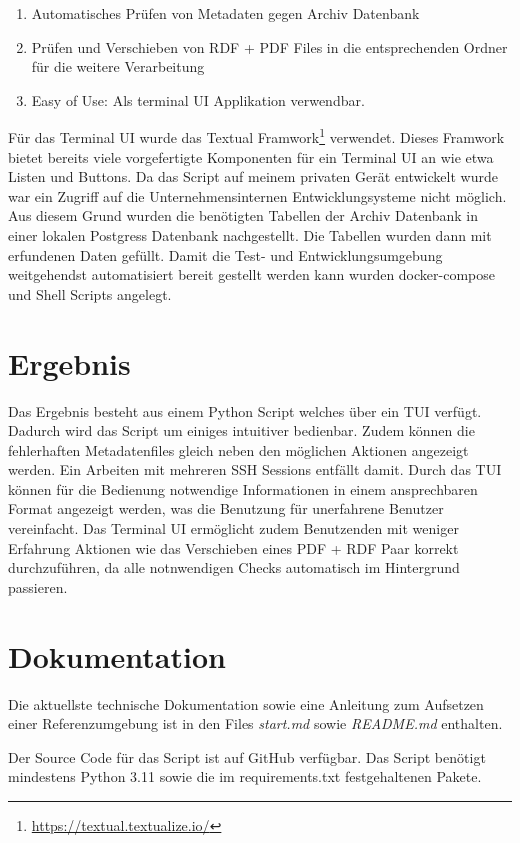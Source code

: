 \documentclass[a4paper,oneside, 12pt]{report}
\begin{document}
\begin{enumerate}
  \item Automatisches Prüfen von Metadaten gegen Archiv Datenbank
  \item Prüfen und Verschieben von RDF + PDF Files in die entsprechenden Ordner für die weitere Verarbeitung
  \item Easy of Use: Als terminal UI Applikation verwendbar.
\end{enumerate}

Für das Terminal UI wurde das Textual Framwork\footnote{\url{https://textual.textualize.io/}}  verwendet. Dieses Framwork bietet bereits viele vorgefertigte Komponenten für ein Terminal UI an wie etwa Listen und Buttons.
Da das Script auf meinem privaten Gerät entwickelt wurde war ein Zugriff auf die Unternehmensinternen Entwicklungsysteme nicht möglich. Aus diesem Grund wurden die benötigten Tabellen der Archiv Datenbank in einer lokalen Postgress Datenbank nachgestellt. Die Tabellen wurden dann mit erfundenen Daten gefüllt. Damit die Test- und Entwicklungsumgebung weitgehendst automatisiert bereit gestellt werden kann wurden docker-compose und Shell Scripts angelegt.


\section{Ergebnis}
Das Ergebnis besteht aus einem Python Script welches über ein \ac{TUI} verfügt. Dadurch wird das Script um einiges intuitiver bedienbar. Zudem können die fehlerhaften Metadatenfiles gleich neben den möglichen Aktionen angezeigt werden. Ein Arbeiten mit mehreren SSH Sessions entfällt damit. Durch das \ac{TUI} können für die Bedienung notwendige Informationen in einem ansprechbaren Format angezeigt werden, was die Benutzung für unerfahrene Benutzer vereinfacht. Das Terminal UI ermöglicht zudem Benutzenden mit weniger Erfahrung Aktionen wie das Verschieben eines PDF + RDF Paar korrekt durchzuführen, da alle notnwendigen Checks automatisch im Hintergrund passieren.

\section{Dokumentation}
Die aktuellste technische Dokumentation sowie eine Anleitung zum Aufsetzen einer Referenzumgebung ist in den Files \textit{start.md} sowie \textit{README.md} enthalten.

Der Source Code für das Script ist auf GitHub verfügbar. Das Script benötigt mindestens Python 3.11 sowie die im requirements.txt festgehaltenen Pakete. 
\end{document}
